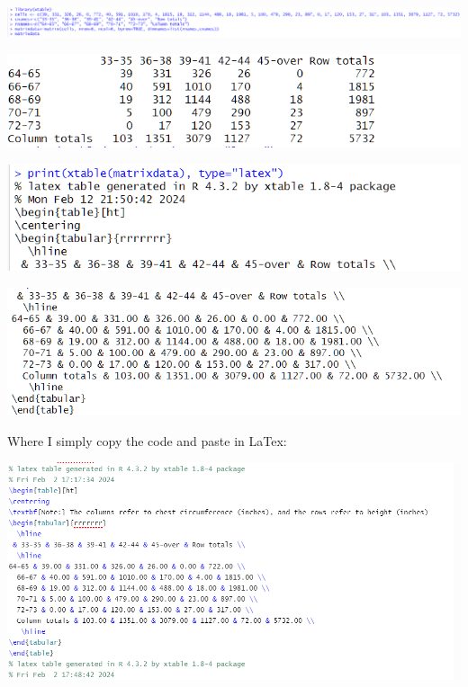 \documentclass{article}
\begin{document}
\begin{center}
\includegraphics[width=\linewidth]{imagesfolder/image.png}
\label{fig:enter-label1}

\includegraphics[width=\linewidth]{imagesfolder/image3.png}
\label{fig:enter-label2}

\includegraphics[width=\linewidth]{imagesfolder/image4.png}
\label{fig:enter-label3}

\includegraphics[width=\linewidth]{imagesfolder/image5.png}
\label{fig:enter-label4}
\end{center}
\begin{spverbatim}
Where I simply copy the code and paste in LaTex:
\end{spverbatim}
\begin{center}
   \includegraphics[width=\linewidth]{imagesfolder/image6.png}
\label{fig:enter-label5} 
\end{center}
\end{document}
